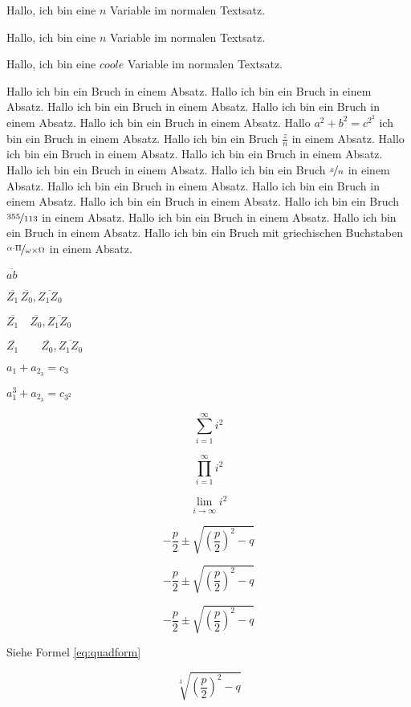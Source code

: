 \documentclass[12pt,ngerman,parskip=full]{scrartcl}
\begin{document}
Hallo, ich bin eine $n$ Variable im normalen Textsatz.

Hallo, ich bin eine \(n\) Variable im normalen Textsatz.

Hallo, ich bin eine \(coole\) Variable im normalen Textsatz. %

Hallo ich bin ein Bruch in einem Absatz. Hallo ich bin ein Bruch in einem Absatz. Hallo ich bin ein Bruch in einem Absatz. Hallo ich bin ein Bruch in einem Absatz. Hallo ich bin ein Bruch in einem Absatz. Hallo \(a^2+b^2 =c^{2^2}\) ich bin ein Bruch in einem Absatz. Hallo ich bin ein Bruch \( \frac{z}{n}\) in einem Absatz. Hallo ich bin ein Bruch in einem Absatz. Hallo ich bin ein Bruch in einem Absatz. Hallo ich bin ein Bruch in einem Absatz. Hallo ich bin ein Bruch \( \nicefrac{z}{n}\) in einem Absatz. Hallo ich bin ein Bruch in einem Absatz. Hallo ich bin ein Bruch in einem Absatz. Hallo ich bin ein Bruch in einem Absatz. Hallo ich bin ein Bruch \( \nicefrac{355}{113}\) in einem Absatz. Hallo ich bin ein Bruch in einem Absatz. Hallo ich bin ein Bruch in einem Absatz. Hallo ich bin ein Bruch mit griechischen Buchstaben  \( \nicefrac{\alpha \cdot \Pi }{\omega \times \Omega}\) in einem Absatz.

\(  \overline{ab} \)

\( \overline{Z_{1}}\,\overline{Z_{0}},  \overline{Z_{1}Z_{0}}  \)

\( \overline{Z_{1}}\quad\overline{Z_{0}},  \overline{Z_{1}Z_{0}}  \)

\( \overline{Z_{1}}\qquad\overline{Z_{0}},  \overline{Z_{1}Z_{0}}  \)

\( a_1 + a_{2_3} = c_3  \)

\( a_1^3 + a_{2_3} = c_{3^2}  \)

\[  \sum_{i=1}^\infty i^2  \]

\[  \prod_{i=1}^\infty i^2  \]

\[ \lim_{i \rightarrow \infty} i^2  \]

$$  - \frac{p}{2} \pm \sqrt{ \left(\frac{p}{2}\right)^2 - q  }    $$ %

\[  - \frac{p}{2} \pm \sqrt{ \left(\frac{p}{2}\right)^2 - q  }    \] %

\begin{equation}
 - \frac{p}{2} \pm \sqrt{ \left(\frac{p}{2}\right)^2 - q  } \label{eq:quadform}
\end{equation}

Siehe Formel \ref{eq:quadform}

\[  \sqrt[3]{ \left(\frac{p}{2}\right)^2 - q  }  \]
\end{document}
